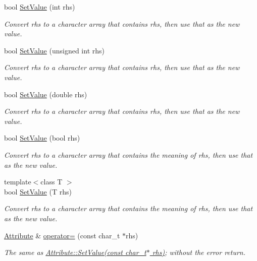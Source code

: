 \begin{DoxyCompactItemize}
bool \hyperlink{classphys_1_1xml_1_1Attribute_a693f7bd8015866c3c4979101c343ce50}{SetValue} (int rhs)
\begin{DoxyCompactList}\small\item\em Convert rhs to a character array that contains rhs, then use that as the new value. \item\end{DoxyCompactList}\item 
bool \hyperlink{classphys_1_1xml_1_1Attribute_a289ac36b218f3912224fd904ccade1ed}{SetValue} (unsigned int rhs)
\begin{DoxyCompactList}\small\item\em Convert rhs to a character array that contains rhs, then use that as the new value. \item\end{DoxyCompactList}\item 
bool \hyperlink{classphys_1_1xml_1_1Attribute_a919034671f61ee408d616409a49dafca}{SetValue} (double rhs)
\begin{DoxyCompactList}\small\item\em Convert rhs to a character array that contains rhs, then use that as the new value. \item\end{DoxyCompactList}\item 
bool \hyperlink{classphys_1_1xml_1_1Attribute_a6df4cf0f083482e69e4e6e94599a1d82}{SetValue} (bool rhs)
\begin{DoxyCompactList}\small\item\em Convert rhs to a character array that contains the meaning of rhs, then use that as the new value. \item\end{DoxyCompactList}\item 
{\footnotesize template$<$class T $>$ }\\bool \hyperlink{classphys_1_1xml_1_1Attribute_af9b12723a227b833d7f8986a524b0e48}{SetValue} (T rhs)
\begin{DoxyCompactList}\small\item\em Convert rhs to a character array that contains the meaning of rhs, then use that as the new value. \item\end{DoxyCompactList}\item 
\hyperlink{classphys_1_1xml_1_1Attribute}{Attribute} \& \hyperlink{classphys_1_1xml_1_1Attribute_a78d7a0436d386040e2d1f8954304b25b}{operator=} (const char\_\-t $\ast$rhs)
\begin{DoxyCompactList}\small\item\em The same as \hyperlink{classphys_1_1xml_1_1Attribute_a470512fcd8b4f7609319bf85df100aaa}{Attribute::SetValue(const char\_\-t$\ast$ rhs)}; without the error return. \item\end{DoxyCompactList}\item 

\end{DoxyCompactItemize}
